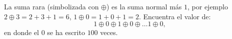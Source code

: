 La suma rara (simbolizada con $\oplus$) es la suma normal más $1$, por ejemplo $2\oplus 3 = 2+3+1 = 6$, $1\oplus 0 = 1 + 0 + 1 = 2$. Encuentra el valor de:
\[1\oplus 0 \oplus 1 \oplus 0 \oplus \dots 1 \oplus 0,\]
en donde el $0$ se ha escrito $100$ veces.
